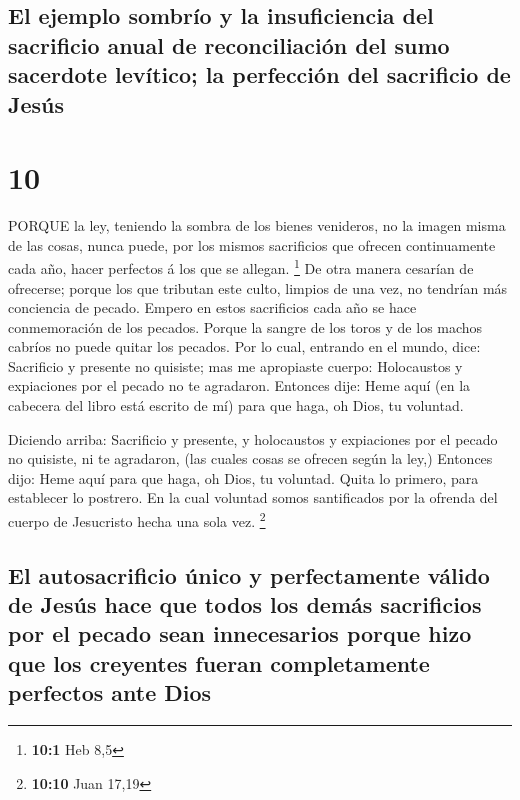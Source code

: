 \hypertarget{el-ejemplo-sombruxedo-y-la-insuficiencia-del-sacrificio-anual-de-reconciliaciuxf3n-del-sumo-sacerdote-levuxedtico-la-perfecciuxf3n-del-sacrificio-de-jesuxfas}{%
\subsection{El ejemplo sombrío y la insuficiencia del sacrificio anual
de reconciliación del sumo sacerdote levítico; la perfección del
sacrificio de
Jesús}\label{el-ejemplo-sombruxedo-y-la-insuficiencia-del-sacrificio-anual-de-reconciliaciuxf3n-del-sumo-sacerdote-levuxedtico-la-perfecciuxf3n-del-sacrificio-de-jesuxfas}}

\hypertarget{section-9}{%
\section{10}\label{section-9}}

 PORQUE la ley, teniendo la sombra de los bienes venideros,
no la imagen misma de las cosas, nunca puede, por los mismos sacrificios
que ofrecen continuamente cada año, hacer perfectos á los que se
allegan. \footnote{\textbf{10:1} Heb 8,5}  De otra manera
cesarían de ofrecerse; porque los que tributan este culto, limpios de
una vez, no tendrían más conciencia de pecado.  Empero en
estos sacrificios cada año se hace conmemoración de los pecados.
 Porque la sangre de los toros y de los machos cabríos no
puede quitar los pecados.  Por lo cual, entrando en el
mundo, dice: Sacrificio y presente no quisiste; mas me apropiaste
cuerpo:  Holocaustos y expiaciones por el pecado no te
agradaron.  Entonces dije: Heme aquí (en la cabecera del
libro está escrito de mí) para que haga, oh Dios, tu voluntad.

 Diciendo arriba: Sacrificio y presente, y holocaustos y
expiaciones por el pecado no quisiste, ni te agradaron, (las cuales
cosas se ofrecen según la ley,)  Entonces dijo: Heme aquí
para que haga, oh Dios, tu voluntad. Quita lo primero, para establecer
lo postrero.  En la cual voluntad somos santificados por la
ofrenda del cuerpo de Jesucristo hecha una sola vez. \footnote{\textbf{10:10}
  Juan 17,19}

\hypertarget{el-autosacrificio-uxfanico-y-perfectamente-vuxe1lido-de-jesuxfas-hace-que-todos-los-demuxe1s-sacrificios-por-el-pecado-sean-innecesarios-porque-hizo-que-los-creyentes-fueran-completamente-perfectos-ante-dios}{%
\subsection{El autosacrificio único y perfectamente válido de Jesús hace
que todos los demás sacrificios por el pecado sean innecesarios porque
hizo que los creyentes fueran completamente perfectos ante
Dios}\label{el-autosacrificio-uxfanico-y-perfectamente-vuxe1lido-de-jesuxfas-hace-que-todos-los-demuxe1s-sacrificios-por-el-pecado-sean-innecesarios-porque-hizo-que-los-creyentes-fueran-completamente-perfectos-ante-dios}}

